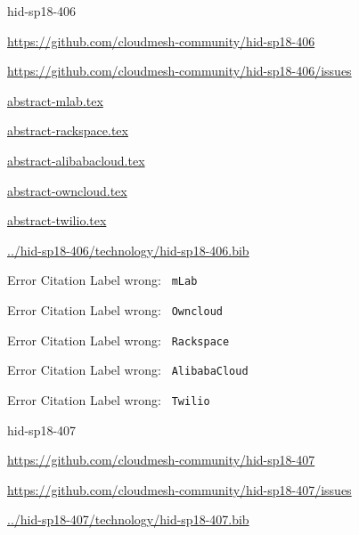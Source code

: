 \begin{IU}

hid-sp18-406

\url{https://github.com/cloudmesh-community/hid-sp18-406}

\url{https://github.com/cloudmesh-community/hid-sp18-406/issues}

\href{https://github.com/cloudmesh-community/hid-sp18-406/blob/master//technology/abstract-mlab.tex}{abstract-mlab.tex}

\href{https://github.com/cloudmesh-community/hid-sp18-406/blob/master//technology/abstract-rackspace.tex}{abstract-rackspace.tex}

\href{https://github.com/cloudmesh-community/hid-sp18-406/blob/master//technology/abstract-alibabacloud.tex}{abstract-alibabacloud.tex}

\href{https://github.com/cloudmesh-community/hid-sp18-406/blob/master//technology/abstract-owncloud.tex}{abstract-owncloud.tex}

\href{https://github.com/cloudmesh-community/hid-sp18-406/blob/master//technology/abstract-twilio.tex}{abstract-twilio.tex}

\href{https://github.com/cloudmesh-community/hid-sp18-406/blob/master//technology/hid-sp18-406.bib}{../hid-sp18-406/technology/hid-sp18-406.bib}

 Error Citation Label wrong: \verb| mLab |

 Error Citation Label wrong: \verb| Owncloud |

 Error Citation Label wrong: \verb| Rackspace |

 Error Citation Label wrong: \verb| AlibabaCloud |

 Error Citation Label wrong: \verb| Twilio |

\end{IU}


\begin{IU}

hid-sp18-407

\url{https://github.com/cloudmesh-community/hid-sp18-407}

\url{https://github.com/cloudmesh-community/hid-sp18-407/issues}

\href{https://github.com/cloudmesh-community/hid-sp18-407/blob/master//technology/hid-sp18-407.bib}{../hid-sp18-407/technology/hid-sp18-407.bib}

\end{IU}


